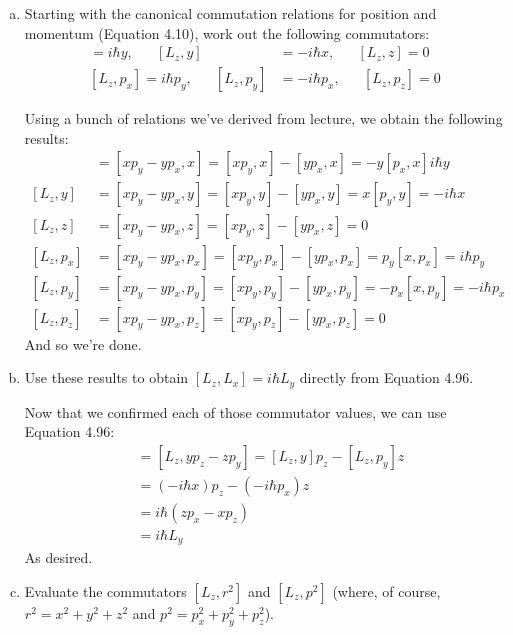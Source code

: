 \documentclass[10pt]{article}
\begin{document}
    \begin{enumerate}[(a)]
        \item Starting with the canonical commutation relations for position and momentum (Equation 4.10), work out the following commutators: 
        \begin{align*}
            [L_z, x] = i\hbar y, \phantom{aaa} [L_z, y]  &= -i\hbar x, \phantom{aaa}[L_z, z] = 0\\
            [L_z, p_x] = i\hbar p_y, \phantom{aaa} [L_z, p_y] &= -i\hbar p_x, \phantom{aaa} [L_z, p_z] = 0
        \end{align*}

        \begin{solution}
            Using a bunch of relations we've derived from lecture, we obtain the following results:
                \begin{align*}
                    [L_z,x] &= [xp_y - yp_x, x] = [xp_y,x] - [yp_x,x] = -y[p_x, x] i\hbar y \\
                    [L_z,y] &= [xp_y - yp_x,y] = [xp_y,y] - [yp_x,y] = x[p_y,y] = -i\hbar x \\
                    [L_z,z] &= [xp_y - yp_x, z] = [xp_y,z] - [yp_x,z] = 0 \\
                    [L_z,p_x] &= [xp_y - yp_x, p_x] = [xp_y,p_x] - [yp_x,p_x] = p_y [x,p_x] = i\hbar p_y \\
                    [L_z,p_y] &= [xp_y - yp_x, p_y] = [xp_y,p_y] - [yp_x,p_y] =-p_x[x,p_y] =  -i\hbar p_x \\
                    [L_z,p_z] &= [xp_y - yp_x,p_z] = [xp_y,p_z] - [yp_x,p_z] = 0
                \end{align*}
                And so we're done.
        \end{solution}

        \item Use these results to obtain $[L_z, L_x] = i\hbar L_y$ directly from Equation 4.96.

        \begin{solution}
            Now that we confirmed each of those commutator values, we can use Equation 4.96:
            \begin{align*}
                [L_z,L_x] &= [L_z, yp_z - zp_y] =  [L_z,y]p_z - [L_z,p_y]z\\
                &= (-i\hbar x)p_z - (-i\hbar p_x)z\\
                &= i\hbar (z p_x - xp_z)\\
                &= i\hbar L_y
            \end{align*}
            As desired.
        \end{solution}
        \item Evaluate the commutators $[L_z, r^2]$ and $[L_z, p^2]$ (where, of course, $r^2 = x^2 + y^2 + z^2$ and $p^2 = p_x^2 + p_y^2 + p_z^2$).
        

\end{enumerate}
\end{document}
